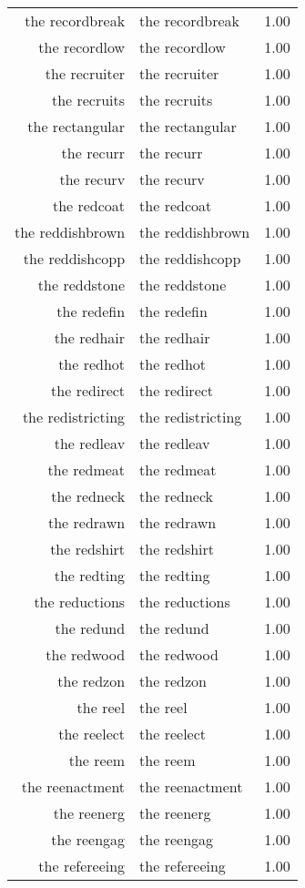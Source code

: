 \begin{table}[ht]
\begin{tabular}{rlr}
  the recordbreak & the recordbreak & 1.00 \\ 
  the recordlow & the recordlow & 1.00 \\ 
  the recruiter & the recruiter & 1.00 \\ 
  the recruits & the recruits & 1.00 \\ 
  the rectangular & the rectangular & 1.00 \\ 
  the recurr & the recurr & 1.00 \\ 
  the recurv & the recurv & 1.00 \\ 
  the redcoat & the redcoat & 1.00 \\ 
  the reddishbrown & the reddishbrown & 1.00 \\ 
  the reddishcopp & the reddishcopp & 1.00 \\ 
  the reddstone & the reddstone & 1.00 \\ 
  the redefin & the redefin & 1.00 \\ 
  the redhair & the redhair & 1.00 \\ 
  the redhot & the redhot & 1.00 \\ 
  the redirect & the redirect & 1.00 \\ 
  the redistricting & the redistricting & 1.00 \\ 
  the redleav & the redleav & 1.00 \\ 
  the redmeat & the redmeat & 1.00 \\ 
  the redneck & the redneck & 1.00 \\ 
  the redrawn & the redrawn & 1.00 \\ 
  the redshirt & the redshirt & 1.00 \\ 
  the redting & the redting & 1.00 \\ 
  the reductions & the reductions & 1.00 \\ 
  the redund & the redund & 1.00 \\ 
  the redwood & the redwood & 1.00 \\ 
  the redzon & the redzon & 1.00 \\ 
  the reel & the reel & 1.00 \\ 
  the reelect & the reelect & 1.00 \\ 
  the reem & the reem & 1.00 \\ 
  the reenactment & the reenactment & 1.00 \\ 
  the reenerg & the reenerg & 1.00 \\ 
  the reengag & the reengag & 1.00 \\ 
  the refereeing & the refereeing & 1.00 \\ 

\end{tabular}
\end{table}
